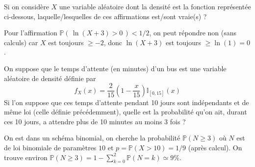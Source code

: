 \begin{question}
Si on considère $X$ une variable aléatoire dont la densité est la fonction représentée ci-dessous, laquelle/lesquelles de ces affirmations est/sont vraie(s) ? 




\begin{answers}
\end{answers}
\begin{explanations}
Pour l'affirmation $\mathbb{P}( \, \ln(X+3) >0 \, ) < 1/2$, on peut répondre non (sans calculs) car $X$ est toujours $\geq -2$, donc $\ln(X+3)$ est toujours $\geq \ln(1)=0$. 
\end{explanations}
\end{question}


\begin{question}
On suppose que le temps d'attente (en minutes) d'un bus est une variable aléatoire de densité définie par 
$$ f_X(x)= \frac{2}{15}\left(1-\frac{x}{15}\right)\mathbb{I}_{[0,15]}(x) $$
Si l'on suppose que ces temps d'attente pendant 10 jours sont indépendants et de même loi (celle définie précédemment), quelle est la probabilité qu'on ait, durant ces 10 jours, a attendre plus de 10 minutes au moins 3 fois ? 
\begin{answers}
\end{answers}
\begin{explanations}
On est dans un schéma binomial, on cherche la probabilité $\mathbb{P}(N\geq 3)$ où $N$ est de loi binomiale de paramètres $10$ et $p=\mathbb{P}(X>10)=1/9$ (après calcul). On trouve environ $\mathbb{P}(N\geq 3)=1-\sum_{k=0}^2 \mathbb{P}(N=k)\simeq 9\%$.
\end{explanations}
\end{question}



